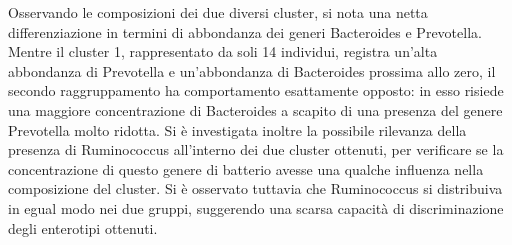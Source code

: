 Osservando le composizioni dei due diversi cluster, si nota una netta differenziazione in termini di abbondanza dei generi Bacteroides e Prevotella. Mentre il cluster 1, rappresentato da soli 14 individui, registra un’alta abbondanza di Prevotella e un'abbondanza di Bacteroides prossima allo zero, il secondo raggruppamento ha comportamento esattamente opposto: in esso risiede una maggiore concentrazione di Bacteroides a scapito di una presenza del genere Prevotella molto ridotta.
Si è investigata inoltre la possibile rilevanza della presenza di Ruminococcus all’interno dei due cluster ottenuti, per verificare se la concentrazione di questo genere di batterio avesse una qualche influenza nella composizione del cluster. Si è osservato tuttavia che Ruminococcus si distribuiva in egual modo nei due gruppi, suggerendo una scarsa capacità di discriminazione degli enterotipi ottenuti.
\\
\vspace*{1cm}
